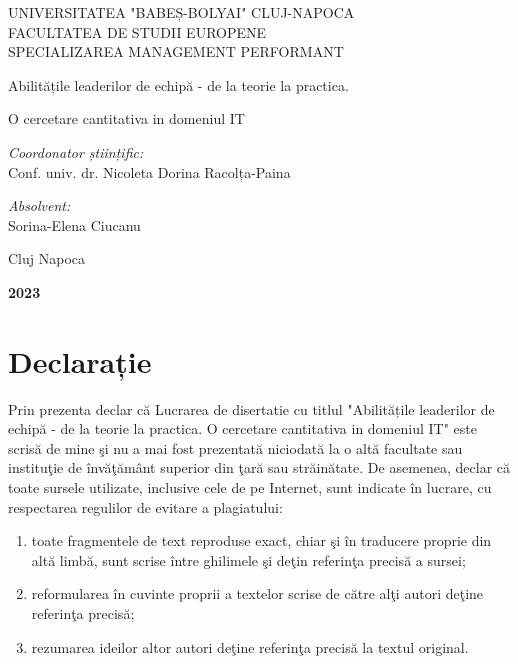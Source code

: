 \documentclass[a4paper, 12pt]{article}
\begin{document}
\begin{titlepage}
	\begin{center}
		\vspace{0.5cm}
		\large {UNIVERSITATEA "BABEȘ-BOLYAI" CLUJ-NAPOCA}
		\\
		\large {FACULTATEA DE STUDII EUROPENE}
		\\\large {SPECIALIZAREA MANAGEMENT PERFORMANT}
		
		\vspace{2.75cm}
		
	
		\huge Abilitățile leaderilor de echipă - de la teorie la practica. 
		
		\huge O cercetare cantitativa  in domeniul IT
		\vspace{1.5 cm}
		
		\vfill
	\end{center}
	
	\begin{flushleft}
		\large{\textit{Coordonator științific:}} \\
		\large{Conf. univ. dr. Nicoleta Dorina Racolța-Paina}
	\end{flushleft}
	
	\begin{flushright}
		\hfill \large {\textit{Absolvent:}} \\
		\hfill \large {Sorina-Elena Ciucanu}
	\end{flushright}
	
	\begin{center}
		\vspace{1.5cm}
		\Large{Cluj Napoca}
		
		\large \textbf{2023}
	\end{center}
\end{titlepage}
\restoregeometry
\thispagestyle{empty}
\section*{Declarație}
\bigskip
\qquad Prin prezenta declar că Lucrarea de disertatie cu titlul "Abilitățile leaderilor de echipă - de la teorie la practica. O cercetare cantitativa  in domeniul IT" este scrisă de mine şi nu a mai fost prezentată niciodată la o altă facultate sau instituţie de învăţământ superior din ţară sau străinătate. De asemenea, declar că toate sursele utilizate, inclusive cele de pe Internet, sunt indicate în lucrare, cu respectarea regulilor de evitare a plagiatului:
	\begin{enumerate}[-]
	\item toate fragmentele de text reproduse exact, chiar şi în traducere proprie din altă limbă, sunt scrise între ghilimele şi deţin referinţa precisă a sursei;
	\item reformularea în cuvinte proprii a textelor scrise de către alţi autori deţine referinţa precisă;
	\item rezumarea ideilor altor autori deţine referinţa precisă la textul original.
	\end{enumerate}
\end{document}

